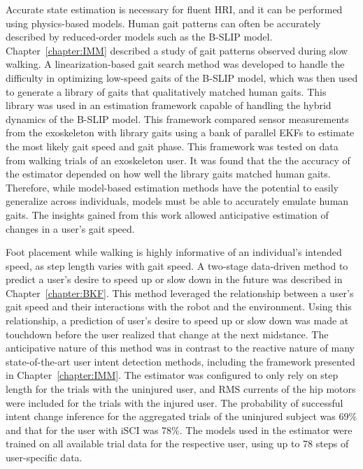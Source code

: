 Accurate state estimation is necessary for fluent HRI, and it can be performed using physics-based models. Human gait patterns can often be accurately described by reduced-order models such as the B-SLIP model. Chapter~\ref{chapter:IMM} described a study of gait patterns observed during slow walking. A linearization-based gait search method was developed to handle the difficulty in optimizing low-speed gaits of the B-SLIP model, which was then used to generate a library of gaits that qualitatively matched human gaits. This library was used in an estimation framework capable of handling the hybrid dynamics of the B-SLIP model. This framework compared sensor measurements from the exoskeleton with library gaits using a bank of parallel EKFs to estimate the most likely gait speed and gait phase. This framework was tested on data from walking trials of an exoskeleton user. It was found that the the accuracy of the estimator depended on how well the library gaits matched human gaits. Therefore, while model-based estimation methods have the potential to easily generalize across individuals, models must be able to accurately emulate human gaits. The insights gained from this work allowed anticipative estimation of changes in a user's gait speed.

Foot placement while walking is highly informative of an individual's intended speed, as step length varies with gait speed. A two-stage data-driven method to predict a user's desire to speed up or slow down in the future was described in Chapter~\ref{chapter:BKF}. This method leveraged the relationship between a user's gait speed and their interactions with the robot and the environment. Using this relationship, a prediction of user's desire to speed up or slow down was made at touchdown before the user realized that change at the next midstance. The anticipative nature of this method was in contrast to the reactive nature of many state-of-the-art user intent detection methods, including the framework presented in Chapter~\ref{chapter:IMM}. The estimator was configured to only rely on step length for the trials with the uninjured user, and RMS currents of the hip motors were included for the trials with the injured user. The probability of successful intent change inference for the aggregated trials of the uninjured subject was 69\% and that for the user with iSCI was 78\%. The models used in the estimator were trained on all available trial data for the respective user, using up to 78 steps of user-specific data.

